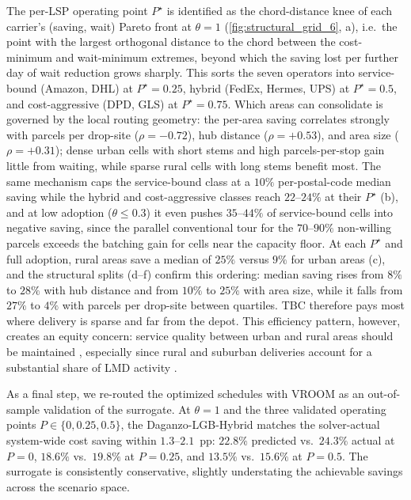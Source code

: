 \documentclass[3p,times,procedia]{elsarticle}
\begin{document}
The per-LSP operating point $P^\star$ is identified as the chord-distance knee of each carrier's (saving, wait) Pareto front at $\theta = 1$ (\autoref{fig:structural_grid_6}, a), i.e.\ the point with the largest orthogonal distance to the chord between the cost-minimum and wait-minimum extremes, beyond which the saving lost per further day of wait reduction grows sharply. This sorts the seven operators into service-bound (Amazon, DHL) at $P^\star = 0.25$, hybrid (FedEx, Hermes, UPS) at $P^\star = 0.5$, and cost-aggressive (DPD, GLS) at $P^\star = 0.75$. Which areas can consolidate is governed by the local routing geometry: the per-area saving correlates strongly with parcels per drop-site ($\rho = -0.72$), hub distance ($\rho = +0.53$), and area size ($\rho = +0.31$); dense urban cells with short stems and high parcels-per-stop gain little from waiting, while sparse rural cells with long stems benefit most. The same mechanism caps the service-bound class at a $10\%$ per-postal-code median saving while the hybrid and cost-aggressive classes reach $22$--$24\%$ at their $P^\star$ (b), and at low adoption ($\theta \leq 0.3$) it even pushes $35$--$44\%$ of service-bound cells into negative saving, since the parallel conventional tour for the $70$--$90\%$ non-willing parcels exceeds the batching gain for cells near the capacity floor. At each $P^\star$ and full adoption, rural areas save a median of $25\%$ versus $9\%$ for urban areas (c), and the structural splits (d--f) confirm this ordering: median saving rises from $8\%$ to $28\%$ with hub distance and from $10\%$ to $25\%$ with area size, while it falls from $27\%$ to $4\%$ with parcels per drop-site between quartiles. TBC therefore pays most where delivery is sparse and far from the depot. This efficiency pattern, however, creates an equity concern: service quality between urban and rural areas should be maintained \citep{Pereira04032017}, especially since rural and suburban deliveries account for a substantial share of LMD activity \citep{BIENZEISLER2026104682}. 

As a final step, we re-routed the optimized schedules with VROOM as an out-of-sample validation of the surrogate. At $\theta = 1$ and the three validated operating points $P \in \{0, 0.25, 0.5\}$, the Daganzo-LGB-Hybrid matches the solver-actual system-wide cost saving within $1.3$--$2.1$~pp: $22.8\%$ predicted vs.\ $24.3\%$ actual at $P = 0$, $18.6\%$ vs.\ $19.8\%$ at $P = 0.25$, and $13.5\%$ vs.\ $15.6\%$ at $P = 0.5$. The surrogate is consistently conservative, slightly understating the achievable savings across the scenario space. 
\end{document}
